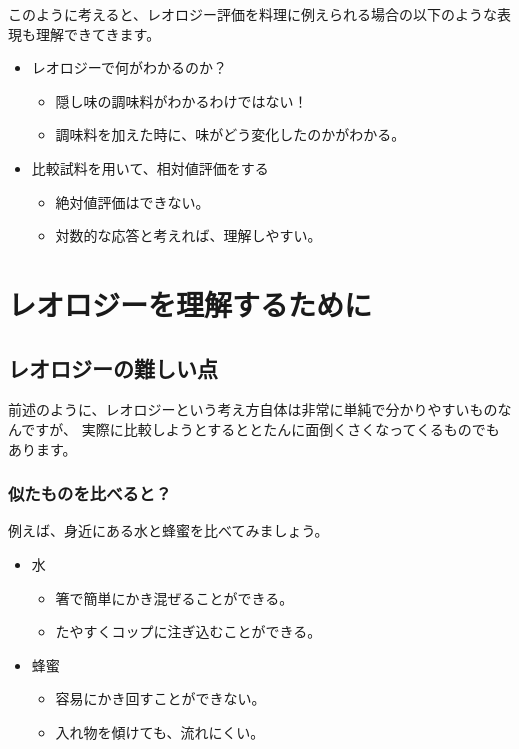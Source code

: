 \documentclass[uplatex,dvipdfmx,a4paper,11pt]{jsarticle}
\begin{document}
このように考えると、レオロジー評価を料理に例えられる場合の以下のような表現も理解できてきます。
\begin{itemize}
	\item レオロジーで何がわかるのか？
	\begin{itemize}
		\item 隠し味の調味料がわかるわけではない！
		\item 調味料を加えた時に、味がどう変化したのかがわかる。
	\end{itemize}
	\item 比較試料を用いて、相対値評価をする
	\begin{itemize}
		\item 絶対値評価はできない。
		\item 対数的な応答と考えれば、理解しやすい。
	\end{itemize}
\end{itemize}

\section{レオロジーを理解するために}
\subsection{レオロジーの難しい点}

前述のように、レオロジーという考え方自体は非常に単純で分かりやすいものなんですが、
実際に比較しようとするととたんに面倒くさくなってくるものでもあります。

\subsubsection{似たものを比べると？}

例えば、身近にある水と蜂蜜を比べてみましょう。
\begin{itemize}
	\item 水
	\begin{itemize}
		\item 箸で簡単にかき混ぜることができる。
		\item たやすくコップに注ぎ込むことができる。
	\end{itemize}
	\item 蜂蜜
	\begin{itemize}
		\item 容易にかき回すことができない。
		\item 入れ物を傾けても、流れにくい。
	\end{itemize}
\end{itemize}
\end{document}
